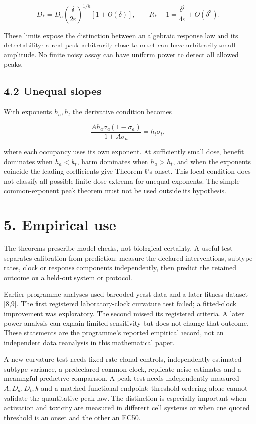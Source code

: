 \documentclass[
  11pt,
  a4paper,
]{article}
\begin{document}
\[D_*=D_a\left(\frac{\delta}{2\varepsilon}\right)^{1/h}[1+O(\delta)],
\qquad R_*-1=\frac{\delta^2}{4\varepsilon}+O(\delta^3).\]

These limits expose the distinction between an algebraic response law and its detectability: a real peak arbitrarily close to onset can have arbitrarily small amplitude. No finite noisy assay can have uniform power to detect all allowed peaks.

\subsection{4.2 Unequal slopes}\label{unequal-slopes}

With exponents \(h_a,h_t\) the derivative condition becomes

\[\frac{A h_a\sigma_a(1-\sigma_a)}{1+A\sigma_a}
=h_t\sigma_t,\]

where each occupancy uses its own exponent. At sufficiently small dose, benefit dominates when \(h_a<h_t\), harm dominates when \(h_a>h_t\), and when the exponents coincide the leading coefficients give Theorem 6's onset. This local condition does not classify all possible finite-dose extrema for unequal exponents. The simple common-exponent peak theorem must not be used outside its hypothesis.

\section{5. Empirical use}\label{empirical-use}

The theorems prescribe model checks, not biological certainty. A useful test separates calibration from prediction: measure the declared interventions, subtype rates, clock or response components independently, then predict the retained outcome on a held-out system or protocol.

Earlier programme analyses used barcoded yeast data and a later fitness dataset {[}8,9{]}. The first registered laboratory-clock curvature test failed; a fitted-clock improvement was exploratory. The second missed its registered criteria. A later power analysis can explain limited sensitivity but does not change that outcome. These statements are the programme's reported empirical record, not an independent data reanalysis in this mathematical paper.

A new curvature test needs fixed-rate clonal controls, independently estimated subtype variance, a predeclared common clock, replicate-noise estimates and a meaningful predictive comparison. A peak test needs independently measured \(A,D_a,D_t,h\) and a matched functional endpoint; threshold ordering alone cannot validate the quantitative peak law. The distinction is especially important when activation and toxicity are measured in different cell systems or when one quoted threshold is an onset and the other an EC50.
\end{document}
